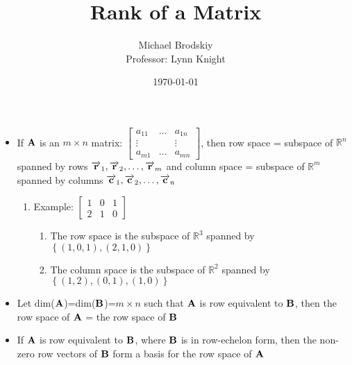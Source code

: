 \documentclass[12pt]{article}
\title{Rank of a Matrix}
\date{\today}
\author{Michael Brodskiy\\ \small Professor: Lynn Knight}
\begin{document}
\maketitle

\begin{itemize}

  \item If $\bold{A}$ is an $m\times n$ matrix: $\begin{bmatrix} a_{11} & \dots & a_{1n}\\ \vdots & & \vdots\\ a_{m1} & \dots & a_{mn} \end{bmatrix}$, then row space = subspace of $\mathbb{R}^n$ spanned by rows $\overrightarrow{\bold{r}}_1, \overrightarrow{\bold{r}}_2, \dots, \overrightarrow{\bold{r}}_m$ and column space = subspace of $\mathbb{R}^m$ spanned by columns $\overrightarrow{\bold{c}}_1, \overrightarrow{\bold{c}}_2, \dots, \overrightarrow{\bold{c}}_n$

    \begin{enumerate}

      \item Example: $\begin{bmatrix} 1 & 0 & 1\\ 2 & 1 & 0 \end{bmatrix}$

        \begin{enumerate}

          \item The row space is the subspace of $\mathbb{R}^3$ spanned by $\left\{ (1,0,1), (2,1,0) \right\}$

          \item The column space is the subspace of $\mathbb{R}^2$ spanned by $\left\{ (1,2), (0,1), (1,0) \right\}$

        \end{enumerate}

    \end{enumerate}

  \item Let dim($\bold{A}$)=dim($\bold{B}$)=$m\times n$ such that $\bold{A}$ is row equivalent to $\bold{B}$, then the row space of $\bold{A}$ = the row space of $\bold{B}$

  \item If $\bold{A}$ is row equivalent to $\bold{B}$, where $\bold{B}$ is in row-echelon form, then the non-zero row vectors of $\bold{B}$ form a basis for the row space of $\bold{A}$


\end{itemize}
\end{document}
